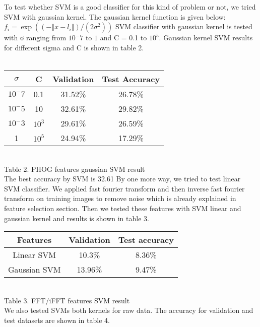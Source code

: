 \documentclass[10pt,twocolumn]{article}
\begin{document}
To test whether SVM is a good classifier for this kind of problem or not, we tried SVM with gaussian kernel. The gaussian kernel function is given below:
$f_i=\exp⁡((-‖x-l_i ‖)/(2σ^2 ))$
\cite {larochelle2007empirical} SVM classifier with gaussian kernel is tested with σ ranging from $10^-7$ to $1$ and C = 0.1 to $10^5$. Gaussian kernel SVM results for different sigma and C is shown in table 2.
\\
\\
\begin{tabular}{|c|c|c|c|}
\hline
$\sigma$ & C &	Validation & Test Accuracy \\ \hline
$10^-7$  & 0.1	& 31.52\%	& 26.78\% \\
$10^-5$	 & 10	& 32.61\%	& 29.82\% \\
$10^-3$	 & $10^3$ & 29.61\%	& 26.59\% \\
1        &$10^5$ & 	24.94\% & 	17.29\% \\
\hline
\end{tabular}
\\

Table 2. PHOG features gaussian SVM result
\\

The best accuracy by SVM is 32.61%
By one more way, we tried to test linear SVM classifier. We applied fast fourier transform and then inverse fast fourier transform on training images to remove noise which is already explained in feature selection section. Then we tested these features with SVM linear and gaussian kernel and results is shown in table 3.
\\

\begin{tabular}{|c|c|c|}
\hline
Features &	Validation & Test accuracy \\ \hline
Linear SVM	& 10.3\% &	8.36\% \\
Gaussian SVM & 	13.96\% & 9.47\% \\
\hline
\end{tabular}
\\

Table 3. FFT/iFFT features SVM result
\\

We also tested SVMs both kernels for raw data. The accuracy for validation and test datasets are shown in table 4.
\\
\end{document}
